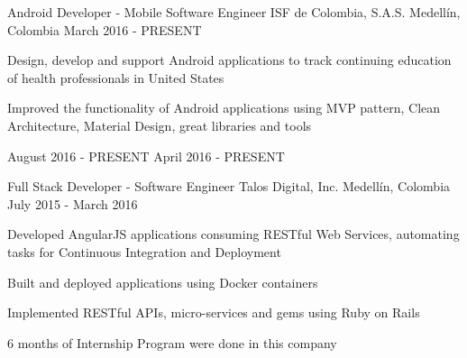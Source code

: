 \begin{cventries}
  \cventry
    {Android Developer - Mobile Software Engineer}
    {ISF de Colombia, S.A.S.}
    {Medellín, Colombia}
    {March 2016 - PRESENT}
    {
      \begin{cvitems}
        \item {Design, develop and support Android applications to track continuing education of
               health professionals in United States}
        \item {Improved the functionality of Android applications using MVP pattern, Clean
               Architecture, Material Design, great libraries and tools}
      \end{cvitems}
      \begin{cvsubentries}
                      {August 2016 - PRESENT}{}
                      {April 2016 - PRESENT}{}
      \end{cvsubentries}
    }
  \cventry
    {Full Stack Developer - Software Engineer}
    {Talos Digital, Inc.}
    {Medellín, Colombia}
    {July 2015 - March 2016}
    {
      \begin{cvitems}
        \item {Developed AngularJS applications consuming RESTful Web Services, automating tasks
               for Continuous Integration and Deployment}
        \item {Built and deployed applications using Docker containers}
        \item {Implemented RESTful APIs, micro-services and gems using Ruby on Rails}
        \item {6 months of Internship Program were done in this company}
      \end{cvitems}
      \begin{cvsubentries}

\end{cvsubentries}}
\end{cventries}
